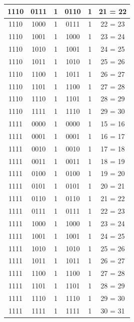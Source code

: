 \documentclass{exam}
\begin{document}
\begin{center}
\begin{longtable}{|c|c|c|c|c|c|}
                1110 & 0111 & 1 & 0110 & 1 & 21 = 22 \\ \hline
                1110 & 1000 & 1 & 0111 & 1 & 22 = 23 \\ \hline
                1110 & 1001 & 1 & 1000 & 1 & 23 = 24 \\ \hline
                1110 & 1010 & 1 & 1001 & 1 & 24 = 25 \\ \hline
                1110 & 1011 & 1 & 1010 & 1 & 25 = 26 \\ \hline
                1110 & 1100 & 1 & 1011 & 1 & 26 = 27 \\ \hline
                1110 & 1101 & 1 & 1100 & 1 & 27 = 28 \\ \hline
                1110 & 1110 & 1 & 1101 & 1 & 28 = 29 \\ \hline
                1110 & 1111 & 1 & 1110 & 1 & 29 = 30 \\ \hline
                1111 & 0000 & 1 & 0000 & 1 & 15 = 16 \\ \hline
                1111 & 0001 & 1 & 0001 & 1 & 16 = 17 \\ \hline
                1111 & 0010 & 1 & 0010 & 1 & 17 = 18 \\ \hline
                1111 & 0011 & 1 & 0011 & 1 & 18 = 19 \\ \hline
                1111 & 0100 & 1 & 0100 & 1 & 19 = 20 \\ \hline
                1111 & 0101 & 1 & 0101 & 1 & 20 = 21 \\ \hline
                1111 & 0110 & 1 & 0110 & 1 & 21 = 22 \\ \hline
                1111 & 0111 & 1 & 0111 & 1 & 22 = 23 \\ \hline
                1111 & 1000 & 1 & 1000 & 1 & 23 = 24 \\ \hline
                1111 & 1001 & 1 & 1001 & 1 & 24 = 25 \\ \hline
                1111 & 1010 & 1 & 1010 & 1 & 25 = 26 \\ \hline
                1111 & 1011 & 1 & 1011 & 1 & 26 = 27 \\ \hline
                1111 & 1100 & 1 & 1100 & 1 & 27 = 28 \\ \hline
                1111 & 1101 & 1 & 1101 & 1 & 28 = 29 \\ \hline
                1111 & 1110 & 1 & 1110 & 1 & 29 = 30 \\ \hline
                1111 & 1111 & 1 & 1111 & 1 & 30 = 31 \\ \hline
            \end{longtable}
    \end{center}
\end{document}
